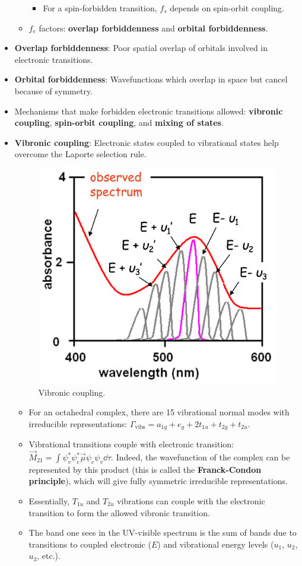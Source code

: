 \documentclass[../notes.tex]{subfiles}
\begin{document}
\begin{itemize}
\begin{itemize}
\begin{itemize}
            \item For a spin-forbidden transition, $f_s$ depends on spin-orbit coupling.
        \end{itemize}
        \item $f_e$ factors: \textbf{overlap forbiddenness} and \textbf{orbital forbiddenness}.
    \end{itemize}
    \item \textbf{Overlap forbiddenness}: Poor spatial overlap of orbitals involved in electronic transitions.
    \item \textbf{Orbital forbiddenness}: Wavefunctions which overlap in space but cancel because of symmetry.
    \item Mechanisms that make forbidden electronic transitions allowed: \textbf{vibronic coupling}, \textbf{spin-orbit coupling}, and \textbf{mixing of states}.
    \item \textbf{Vibronic coupling}: Electronic states coupled to vibrational states help overcome the Laporte selection rule.
    \begin{figure}[h!]
        \centering
        \includegraphics[width=0.3\linewidth]{../ExtFiles/vibronicCoupling.png}
        \caption{Vibronic coupling.}
        \label{fig:vibronicCoupling}
    \end{figure}
    \begin{itemize}
        \item For an octahedral complex, there are 15 vibrational normal modes with irreducible representations: $\Gamma_\text{vibs}=a_{1g}+e_g+2t_{1u}+t_{2g}+t_{2u}$.
        \item Vibrational transitions couple with electronic transition: $\vec{M}_{21}=\int\psi_v^*\psi_e^*\vec{\mu}\psi_e\psi_v\dd{\tau}$. Indeed, the wavefunction of the complex can be represented by this product (this is called the \textbf{Franck-Condon principle}), which will give fully symmetric irreducible representations.
        \item Essentially, $T_{1u}$ and $T_{2u}$ vibrations can couple with the electronic transition to form the allowed vibronic transition.
        \item The band one sees in the UV-visible spectrum is the sum of bands due to transitions to coupled electronic ($E$) and vibrational energy levels ($u_1$, $u_2$, $u_3$, etc.).

\end{itemize}
\end{itemize}
\end{document}
